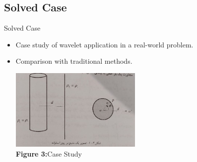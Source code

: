 \documentclass{beamer}
\begin{document}
\subsection{Solved Case}
\begin{frame}{Solved Case}
    \begin{itemize}
        \item Case study of wavelet application in a real-world problem.
        \item Comparison with traditional methods.\\[0.5cm]
        \vfil
        \centering
        
        \includegraphics[width=0.5\textwidth, height=0.4\textheight]{Case.jpg} %
        \\[0.2cm] %
        {\small \textbf {Figure 3:}Case Study} %
    \end{itemize}
\end{frame}

\end{document}
